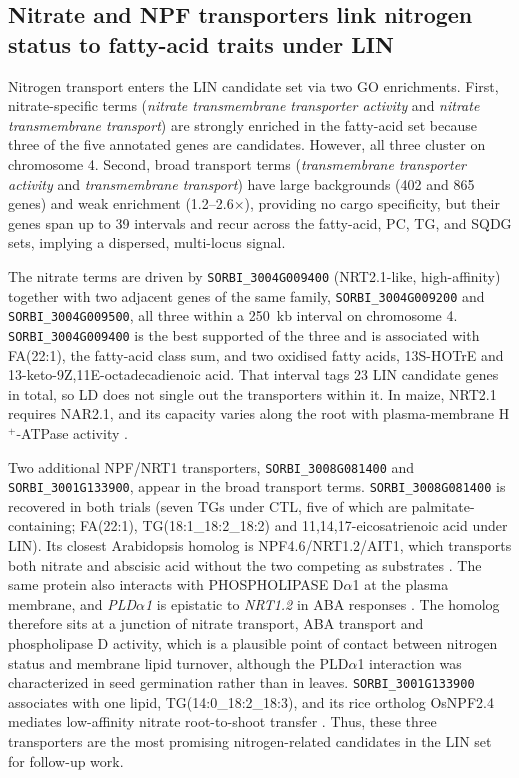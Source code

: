 \documentclass[9pt,twocolumn,twoside]{rilabRxiv}
\begin{document}
\subsection*{Nitrate and NPF transporters link nitrogen status to fatty-acid traits under LIN}

Nitrogen transport enters the LIN candidate set via two GO enrichments. First, nitrate-specific terms (\textit{nitrate transmembrane transporter activity} and \textit{nitrate transmembrane transport}) are strongly enriched in the fatty-acid set because three of the five annotated genes are candidates. However, all three cluster on chromosome 4. Second, broad transport terms (\textit{transmembrane transporter activity} and \textit{transmembrane transport}) have large backgrounds (402 and 865 genes) and weak enrichment (1.2–2.6$\times$), providing no cargo specificity, but their genes span up to 39 intervals and recur across the fatty-acid, PC, TG, and SQDG sets, implying a dispersed, multi-locus signal.

The nitrate terms are driven by \texttt{SORBI\_3004G009400} (NRT2.1-like, high-affinity) together with two adjacent genes of the same family, \texttt{SORBI\_3004G009200} and \texttt{SORBI\_3004G009500}, all three within a 250~kb interval on chromosome 4. \texttt{SORBI\_3004G009400} is the best supported of the three and is associated with FA(22:1), the fatty-acid class sum, and two oxidised fatty acids, 13S-HOTrE and 13-keto-9Z,11E-octadecadienoic acid. That interval tags 23 LIN candidate genes in total, so LD does not single out the transporters within it. In maize, NRT2.1 requires NAR2.1, and its capacity varies along the root with plasma-membrane H$^+$-ATPase activity \citep{Lupini2016NAR2, Sorgona2011Nitrate}.

Two additional NPF/NRT1 transporters, \texttt{SORBI\_3008G081400} and \texttt{SORBI\_3001G133900}, appear in the broad transport terms. \texttt{SORBI\_3008G081400} is recovered in both trials (seven TGs under CTL, five of which are palmitate-containing; FA(22:1), TG(18:1\_18:2\_18:2) and 11,14,17-eicosatrienoic acid under LIN). Its closest Arabidopsis homolog is NPF4.6/NRT1.2/AIT1, which transports both nitrate and abscisic acid without the two competing as substrates \citep{Kanno2013NPF46}. The same protein also interacts with PHOSPHOLIPASE D$\alpha$1 at the plasma membrane, and \textit{PLD$\alpha$1} is epistatic to \textit{NRT1.2} in ABA responses \citep{Li2020NRT12PLD}. The homolog therefore sits at a junction of nitrate transport, ABA transport and phospholipase D activity, which is a plausible point of contact between nitrogen status and membrane lipid turnover, although the PLD$\alpha$1 interaction was characterized in seed germination rather than in leaves. \texttt{SORBI\_3001G133900} associates with one lipid, TG(14:0\_18:2\_18:3), and its rice ortholog OsNPF2.4 mediates low-affinity nitrate root-to-shoot transfer \citep{Xia2015NPF24}. Thus, these three transporters are the most promising nitrogen-related candidates in the LIN set for follow-up work.
\end{document}
